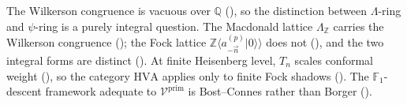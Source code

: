 \begin{remark}
\label{v4-arith:rem:three-level-structure}
The Wilkerson congruence is vacuous over \(\mathbb{Q}\)
(), so the distinction between
\(\Lambda\)-ring and \(\psi\)-ring is a purely integral question.
The Macdonald lattice \(\Lambda_{\mathbb{Z}}\) carries the Wilkerson
congruence (); the Fock lattice
\(\mathbb{Z}\langle a^{(p)}_{-\vec{n}}|0\rangle\rangle\) does
not (), and the two integral
forms are distinct (). At finite
Heisenberg level, \(T_{n}\) scales conformal weight
(), so the category \(\mathrm{HVA}\)
applies only to finite Fock shadows
(). The \(\mathbb{F}_{1}\)-descent
framework adequate to \(\mathcal{V}^{\mathrm{prim}}\) is
Bost--Connes rather than Borger ().
\end{remark}
